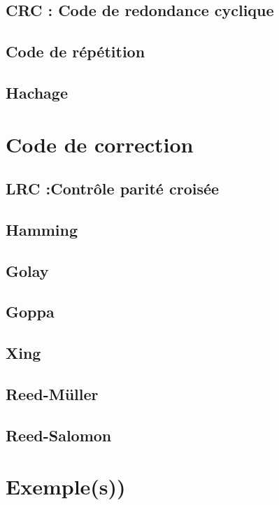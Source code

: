 \documentclass[a4paper,10pt]{report}
\begin{document}
        \chapter{CRC : Code de redondance cyclique}

        \chapter{Code de répétition}

        \chapter{Hachage}


    \part{Code de correction}
        \chapter{LRC :Contrôle parité croisée}

        \chapter{Hamming}

        \chapter{Golay}

        \chapter{Goppa}

        \chapter{Xing}

        \chapter{Reed-Müller}

        \chapter{Reed-Salomon}


    \appendix
        \part{Exemple(s))}
\end{document}
